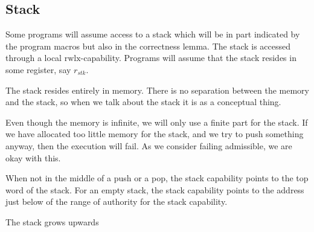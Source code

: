 \documentclass[a4paper]{article}
\newcommand{\var}[1]{\mathit{#1}}
\newcommand{\plainperm}[1]{\mathrm{#1}}
\newcommand{\rwlx}{\plainperm{rwlx}}
\begin{document}
              \subsection{Stack}
              Some programs will assume access to a stack which will be in part indicated by the program macros but also in the correctness lemma. The stack is accessed through a local $\rwlx$-capability. Programs will assume that the stack resides in some register, say $r_{\var{stk}}$.

              The stack resides entirely in memory. There is no separation between the memory and the stack, so when we talk about the stack it is as a conceptual thing. %

              Even though the memory is infinite, we will only use a finite part for the stack. If we have allocated too little memory for the stack, and we try to push something anyway, then the execution will fail. As we consider failing admissible, we are okay with this. 

              When not in the middle of a push or a pop, the stack capability points to the top word of the stack. For an empty stack, the stack capability points to the address just below of the range of authority for the stack capability.

              The stack grows upwards
\end{document}
